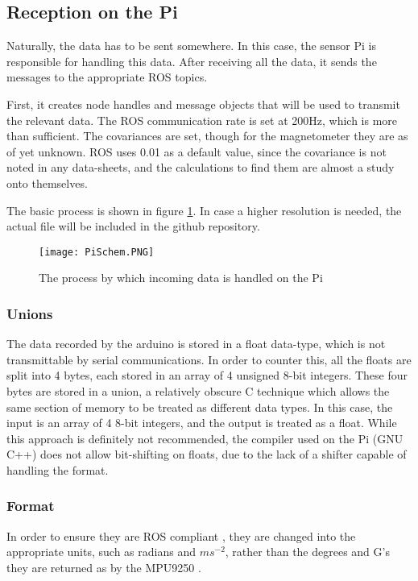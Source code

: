 \subsection{Reception on the Pi}
Naturally, the data has to be sent somewhere.
In this case, the sensor Pi is responsible for handling this data.
After receiving all the data, it sends the messages to the appropriate ROS topics.

First, it creates node handles and message objects that will be used to transmit the relevant data.
The ROS communication rate is set at 200Hz, which is more than sufficient.
The covariances are set, though for the magnetometer they are as of yet unknown.
ROS uses 0.01 as a default value, since the covariance is not noted in any data-sheets, and the calculations to find them are almost a study onto themselves.

The basic process is shown in figure \ref{fig::piDataReception}.
In case a higher resolution is needed, the actual file will be included in the github repository.

\begin{figure}[H]
\centering
\texttt{[image: PiSchem.PNG]}
\caption{The process by which incoming data is handled on the Pi}
\label{fig::piDataReception}
\end{figure}


\subsubsection{Unions} \label{sec::union}
The data recorded by the arduino is stored in a float data-type, which is not transmittable by serial communications.
In order to counter this, all the floats are split into 4 bytes, each stored in an array of 4 unsigned 8-bit integers.
These four bytes are stored in a union, a relatively obscure C technique which allows the same section of memory to be treated as different data types.
In this case, the input is an array of 4 8-bit integers, and the output is treated as a float.
While this approach is definitely not recommended, the compiler used on the Pi (GNU C++) does not allow bit-shifting on floats, due to the lack of a shifter capable of handling the format.

\subsubsection{Format}
In order to ensure they are ROS compliant \cite{ROSformat}, they are changed into the appropriate units, such as radians and $ms^{-2}$, rather than the degrees and G's they are returned as by the MPU9250 \cite{MPU9250}.

